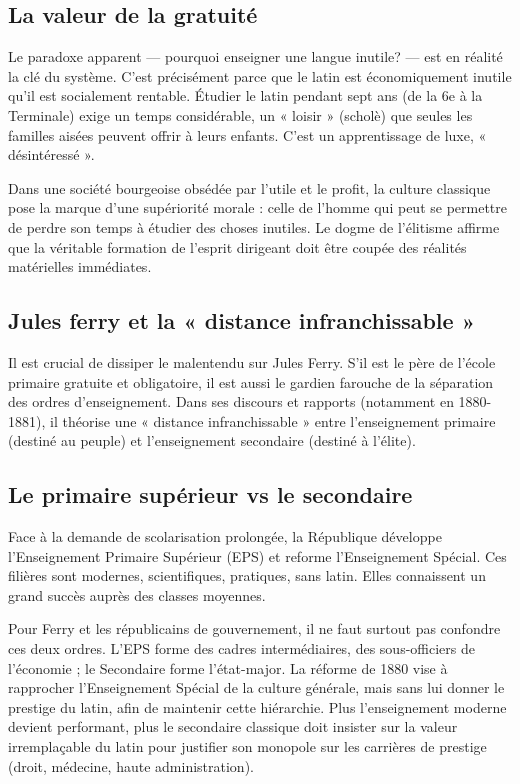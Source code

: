 \subsection{La valeur de la gratuité}

Le paradoxe apparent — pourquoi enseigner une langue inutile? — est en réalité la clé du système.
C'est précisément parce que le latin est économiquement inutile qu'il est socialement rentable.
Étudier le latin pendant sept ans (de la 6e à la Terminale) exige un temps considérable, un « loisir
» (scholè) que seules les familles aisées peuvent offrir à leurs enfants. C'est un apprentissage de
luxe, « désintéressé ».

Dans une société bourgeoise obsédée par l'utile et le profit, la culture classique pose la marque
d'une supériorité morale : celle de l'homme qui peut se permettre de perdre son temps à étudier des
choses inutiles. Le dogme de l'élitisme affirme que la véritable formation de l'esprit dirigeant
doit être coupée des réalités matérielles immédiates.\cite{I-1-3-ref40}



\subsection{Jules ferry et la « distance infranchissable »}

Il est crucial de dissiper le malentendu sur Jules Ferry. S'il est le père de l'école primaire
gratuite et obligatoire, il est aussi le gardien farouche de la séparation des ordres
d'enseignement. Dans ses discours et rapports (notamment en 1880-1881), il théorise une « distance
infranchissable » entre l'enseignement primaire (destiné au peuple) et l'enseignement secondaire
(destiné à l'élite).\cite{I-1-3-ref41}



\subsection{Le primaire supérieur vs le secondaire}

Face à la demande de scolarisation prolongée, la République développe l'Enseignement Primaire
Supérieur (EPS) et reforme l'Enseignement Spécial. Ces filières sont modernes, scientifiques,
pratiques, sans latin. Elles connaissent un grand succès auprès des classes moyennes.

Pour Ferry et les républicains de gouvernement, il ne faut surtout pas confondre ces deux ordres.
L'EPS forme des cadres intermédiaires, des sous-officiers de l'économie ; le Secondaire forme
l'état-major. La réforme de 1880 vise à rapprocher l'Enseignement Spécial de la culture générale,
mais sans lui donner le prestige du latin, afin de maintenir cette hiérarchie.\cite{I-1-3-ref43}
Plus l'enseignement moderne devient performant, plus le secondaire classique doit insister sur la
valeur irremplaçable du latin pour justifier son monopole sur les carrières de prestige (droit,
médecine, haute administration).



